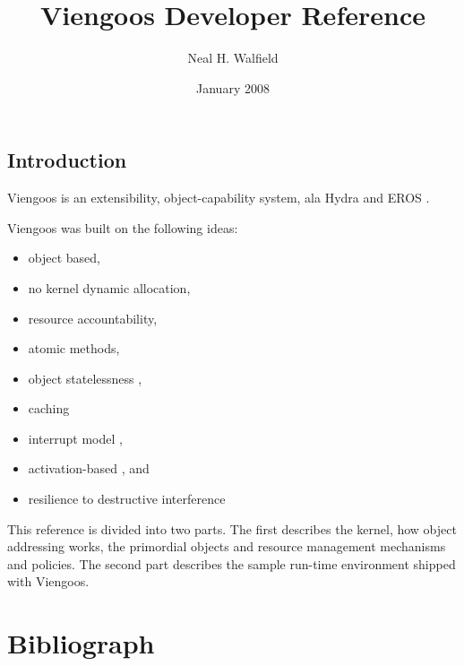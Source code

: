 \documentclass[12pt,a4paper]{book}
\title{Viengoos Developer Reference}
\author{Neal H. Walfield}
\date{January 2008}
\begin{document}
\frontmatter
\maketitle
\tableofcontents

\mainmatter

\setlength{\parindent}{0pt}
\setlength{\parskip}{1ex plus 0.5ex minus 0.2ex}

\chapter{Introduction}

Viengoos is an extensibility, object-capability system, ala Hydra
\cite{wulf74hydra} and EROS \cite{shapiro99eros}.  

Viengoos was built on the following ideas:

\begin{itemize}
\item object based,
\item no kernel dynamic allocation,
\item resource accountability,
\item atomic methods,
\item object statelessness \cite{tullmann96userlevel-checkpointing-through-exportable-kernel-state},
\item caching \cite{cheriton94caching-model-of-os-kernel-functionality}
\item interrupt model \cite{ford99interface-and-execution-models},
\item activation-based \cite{roscoe95structure-of-a-multi-service-os}, and
\item resilience to destructive interference \cite{miller06robust-composition}
\end{itemize}

This reference is divided into two parts.  The first describes the
kernel, how object addressing works, the primordial objects and
resource management mechanisms and policies.  The second part
describes the sample run-time environment shipped with Viengoos.




\part{Bibliograph}




\backmatter

\end{document}
